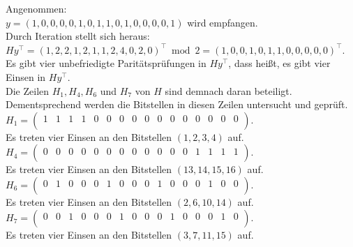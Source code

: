 \begin{Beispiel}
    Angenommen:\\
    $y = (1,0,0,0,0,1,0,1,1,0,1,0,0,0,0,1)$ wird empfangen.\\
    
    Durch Iteration stellt sich heraus:\\
    $Hy^\intercal = (1,2,2,1,2,1,1,2,4,0,2,0)^\intercal \bmod 2 = (1,0,0,1,0,1,1,0,0,0,0,0)^\intercal$.\\
    
    Es gibt vier unbefriedigte Paritätsprüfungen in $Hy^\intercal$, dass hei\ss{}t, es gibt vier Einsen in $Hy^\intercal.$\\
    Die Zeilen $H_1, H_4, H_6$ und $H_7$ von $H$ sind demnach daran beteiligt.\\ 
    Dementsprechend werden die Bitstellen in diesen Zeilen untersucht und geprüft.\\
    
    $H_1= \left( \begin{array}{rrrrrrrrrrrrrrrr}
        1 & 1 & 1 & 1 & 0 & 0 & 0 & 0 & 0 & 0 & 0 & 0 & 0 & 0 & 0 & 0 \\
       \end{array}\right). 
    $\\
    Es treten vier Einsen an den Bitstellen $(1, 2, 3, 4)$ auf.\\
    
    $H_4= \left( \begin{array}{rrrrrrrrrrrrrrrr}
        0 & 0 & 0 & 0 & 0 & 0 & 0 & 0 & 0 & 0 & 0 & 0 & 1 & 1 & 1 & 1 \\
       \end{array}\right). 
    $\\
    Es treten vier Einsen an den Bitstellen $(13, 14, 15, 16)$ auf.\\
    
    $H_6= \left( \begin{array}{rrrrrrrrrrrrrrrr}
        0 & 1 & 0 & 0 & 0 & 1 & 0 & 0 & 0 & 1 & 0 & 0 & 0 & 1 & 0 & 0 \\
       \end{array}\right). 
    $\\
    Es treten vier Einsen an den Bitstellen $(2, 6, 10, 14)$ auf.\\
    
    $H_7= \left( \begin{array}{rrrrrrrrrrrrrrrr}
        0 & 0 & 1 & 0 & 0 & 0 & 1 & 0 & 0 & 0 & 1 & 0 & 0 & 0 & 1 & 0 \\
       \end{array}\right). 
    $\\
    Es treten vier Einsen an den Bitstellen $(3, 7, 11, 15)$ auf.\\
    

\end{Beispiel}
